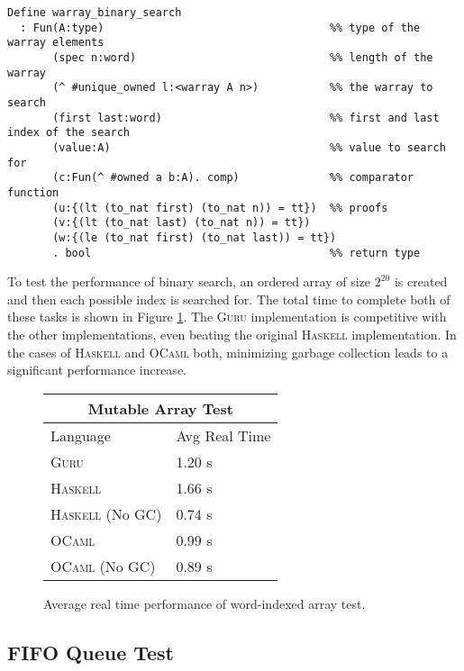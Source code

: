 \documentclass[9pt,natbib]{sigplanconf}
\begin{document}
\begin{figure*}
\begin{verbatim}
Define warray_binary_search
  : Fun(A:type)                                   %% type of the warray elements
       (spec n:word)                              %% length of the warray
       (^ #unique_owned l:<warray A n>)           %% the warray to search
       (first last:word)                          %% first and last index of the search
       (value:A)                                  %% value to search for
       (c:Fun(^ #owned a b:A). comp)              %% comparator function
       (u:{(lt (to_nat first) (to_nat n)) = tt})  %% proofs
       (v:{(lt (to_nat last) (to_nat n)) = tt})
       (w:{(le (to_nat first) (to_nat last)) = tt})
       . bool                                     %% return type
\end{verbatim}
\caption{The type of the binary search algorithm for word-indexed arrays.}
\label{bs}
\end{figure*}

To test the performance of binary search, an ordered array of size
$2^{20}$ is created and then each possible index is searched for.  The
total time to complete both of these tasks is shown in Figure
\ref{warraystats}.  The \textsc{Guru} implementation is competitive
with the other implementations, even beating the original \textsc{Haskell}
implementation.  In the cases of \textsc{Haskell} and \textsc{OCaml} both, minimizing
garbage collection leads to a significant performance increase.

\begin{figure}
\begin{center}
\begin{tabular}{| l | l |}
\hline
\multicolumn{2}{|c|}{Mutable Array Test} \\
\hline
Language & Avg Real Time \\
\hline
\textsc{Guru} & 1.20 s \\
\textsc{Haskell} & 1.66 s\\
\textsc{Haskell} (No GC) & 0.74 s \\
\textsc{OCaml} & 0.99 s \\
\textsc{OCaml} (No GC) & 0.89 s \\
\hline
\end{tabular}
\end{center}
\caption{Average real time performance of word-indexed array test.}
\label{warraystats}
\end{figure}

\subsection{FIFO Queue Test}
\end{document}
